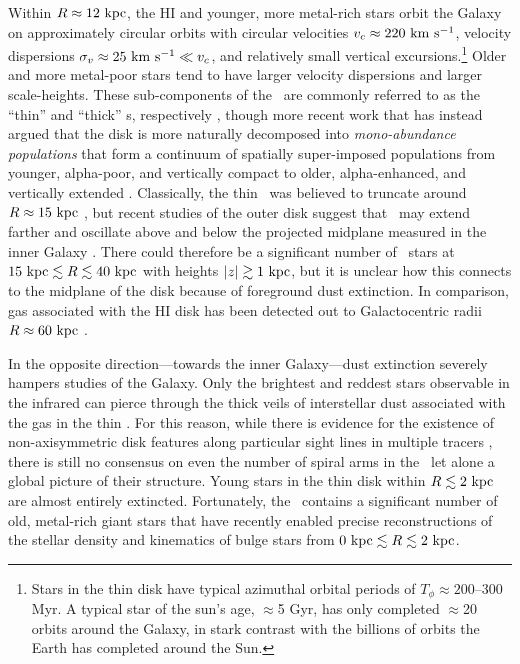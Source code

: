 Within $R\approx 12~\mathrm{kpc}$, the HI and younger, more metal-rich stars orbit the Galaxy on approximately circular orbits with circular velocities $v_c \approx 220~\mathrm{km}~\mathrm{s}^{-1}$, velocity dispersions $\sigma_v \approx 25~\mathrm{km}~\mathrm{s}^{-1} \ll v_c$, and relatively small vertical excursions.\footnote{Stars in the thin disk have typical azimuthal orbital periods of $T_\phi \approx 200$--300 Myr. A typical star of the sun's age, $\approx$5 Gyr, has only completed $\approx$20 orbits around the Galaxy, in stark contrast with the billions of orbits the Earth has completed around the Sun.} Older and more metal-poor stars tend to have larger velocity dispersions and larger scale-heights. These sub-components of the \mwdisk\ are commonly referred to as the ``thin'' and ``thick'' \mwdisk s, respectively \citep{gilmore83}, though more recent work that has instead argued that the disk is more naturally decomposed into \emph{mono-abundance populations} that form a continuum of spatially super-imposed populations from younger, alpha-poor, and vertically compact to older, alpha-enhanced, and vertically extended \citep[see, e.g., Figure~12 and Section~6 in][]{rixbovy13, bovy12-nothickdisk}. Classically, the thin \mwdisk\ was believed to truncate around $R \approx 15~\mathrm{kpc}$ \citep[e.g.,][]{robin92}, but recent studies of the outer disk suggest that \mwdisk\ may extend farther and oscillate above and below the projected midplane measured in the inner Galaxy \citep{xu15, apw15-triand}. There could therefore be a significant number of \mwdisk\ stars at $15~\mathrm{kpc} \lesssim R \lesssim 40~\mathrm{kpc}$ with heights $|z| \gtrsim 1~\mathrm{kpc}$, but it is unclear how this connects to the midplane of the disk because of foreground dust extinction. In comparison, gas associated with the HI disk has been detected out to Galactocentric radii $R \approx 60~\mathrm{kpc}$ \citep{kalberla08}.

In the opposite direction---towards the inner Galaxy---dust extinction severely hampers studies of the Galaxy. Only the brightest and reddest stars observable in the infrared can pierce through the thick veils of interstellar dust associated with the gas in the thin \mwdisk. For this reason, while there is evidence for the existence of non-axisymmetric disk features along particular sight lines in multiple tracers \citep[e.g.,][]{levine06, reid14}, there is still no consensus on even the number of spiral arms in the \mwdisk\ let alone a global picture of their structure. Young stars in the thin disk within $R \lesssim 2~\mathrm{kpc}$ are almost entirely extincted. Fortunately, the \mwbulge\ contains a significant number of old, metal-rich giant stars that have recently enabled precise reconstructions of the stellar density and kinematics of bulge stars from $0~\mathrm{kpc} \lesssim R \lesssim 2~\mathrm{kpc}$.

